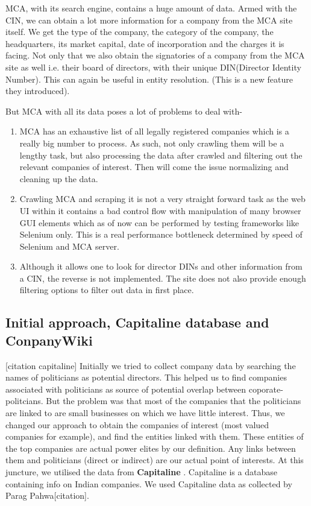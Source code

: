 MCA, with its search engine, contains a huge amount of data. Armed with the CIN, we can obtain a lot more information for a company from the MCA site itself. We get the type of the company, the category of the company, the headquarters, its market capital, date of incorporation and the charges it is facing. Not only that we also obtain the signatories of a company from the MCA site as well i.e. their board of directors, with their unique DIN(Director Identity Number). This can again be useful in entity resolution. (This is a new feature they introduced).

But MCA with all its data poses a lot of problems to deal with-
\begin{enumerate}
    \item MCA has an exhaustive list of all legally registered companies which is a really big number to process. As such, not only crawling  them will be a lengthy task, but also processing the data after crawled and filtering out the relevant companies of interest. Then will come the issue normalizing and cleaning up the data.
    \item Crawling MCA and scraping it is not a very straight forward task as the web UI within it contains a bad control flow with  manipulation of many browser GUI elements which as of now can be performed by testing frameworks like Selenium only. This is a real performance bottleneck determined by speed of Selenium and MCA server. 
    \item Although it allows one to look for director DINs and other information from a CIN, the reverse is not implemented. The site does not also provide enough filtering options to filter out data in first place.
\end{enumerate}

\subsection{Initial approach, Capitaline database and ConpanyWiki}
[citation capitaline]
Initially we tried to collect company data by searching the names of politicians as potential directors. This helped us to find companies associated with politicians as source of potential overlap between coporate-politcians. But the problem was that most of the companies that the politicians are linked to are small businesses on which we have little interest. Thus, we changed our approach to obtain the companies of interest (most valued companies for example), and find the entities linked with them. These entities of the top companies are actual power elites by our definition. Any links between them and politicians (direct or indirect) are our actual point of interests.
At this juncture, we utilised the data from \textbf{ Capitaline }. Capitaline is a database containing info on Indian companies. We used Capitaline data as collected by Parag Pahwa[citation].

